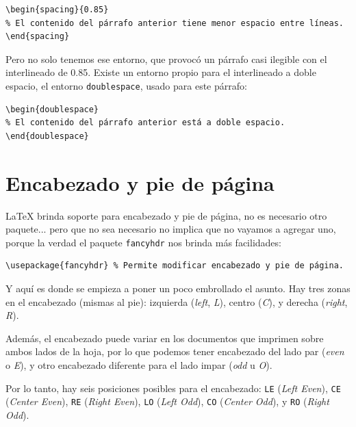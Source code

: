 \begin{lstlisting}[style=latex]
\begin{spacing}{0.85}
% El contenido del párrafo anterior tiene menor espacio entre líneas.
\end{spacing}
\end{lstlisting}

\begin{doublespace}
Pero no solo tenemos ese entorno, que provocó un párrafo casi ilegible con el interlineado de 0.85. Existe un entorno propio para el interlineado a doble espacio, el entorno \texttt{doublespace}, usado para este párrafo:
\end{doublespace}

\begin{lstlisting}[style=latex]
\begin{doublespace}
% El contenido del párrafo anterior está a doble espacio.
\end{doublespace}
\end{lstlisting}



\section{Encabezado y pie de página}
\label{sec:encabezado_y_pie_de_pagina}



\LaTeX{} brinda soporte para encabezado y pie de página, no es necesario otro paquete... pero que no sea necesario no implica que no vayamos a agregar uno, porque la verdad el paquete \texttt{fancyhdr} nos brinda más facilidades:

\begin{lstlisting}[style=latex]
\usepackage{fancyhdr} % Permite modificar encabezado y pie de página.
\end{lstlisting}

Y aquí es donde se empieza a poner un poco embrollado el asunto. Hay tres zonas en el encabezado (mismas al pie): izquierda (\emph{left}, \emph{L}), centro (\emph{C}), y derecha (\emph{right}, \emph{R}).

Además, el encabezado puede variar en los documentos que imprimen sobre ambos lados de la hoja, por lo que podemos tener encabezado del lado par (\emph{even} o \emph{E}), y otro encabezado diferente para el lado impar (\emph{odd} u \emph{O}).

Por lo tanto, hay seis posiciones posibles para el encabezado: \texttt{LE} (\emph{Left Even}), \texttt{CE} (\emph{Center Even}), \texttt{RE} (\emph{Right Even}), \texttt{LO} (\emph{Left Odd}), \texttt{CO} (\emph{Center Odd}), y \texttt{RO} (\emph{Right Odd}).

